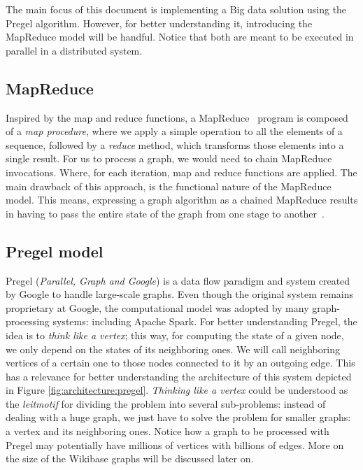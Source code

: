 The main focus of this document is implementing a Big data solution using the Pregel algorithm. However, for better understanding it, introducing the MapReduce model will be handful. Notice that both are meant to be executed in parallel in a distributed system.

\subsection{MapReduce}

Inspired by the map and reduce functions, a MapReduce~\cite{wiki:MapReduce} program is composed of a \textit{map procedure}, where we apply a simple operation to all the elements of a sequence, followed by a \textit{reduce} method, which transforms those elements into a single result. For us to process a graph, we would need to chain MapReduce invocations. Where, for each iteration, map and reduce functions are applied. The main drawback of this approach, is the functional nature of the MapReduce model. This means, expressing a graph algorithm as a chained MapReduce results in having to pass the entire state of the graph from one stage to another~\cite{10.1145/1807167.1807184}.

\subsection{Pregel model}
\label{section:pregel}

Pregel (\textit{Parallel, Graph and Google}) is a data flow paradigm and system created by Google to handle large-scale graphs. Even though the original system remains proprietary at Google, the computational model was adopted by many graph-processing systems: including Apache Spark. For better understanding Pregel, the idea is to \textit{think like a vertex}; this way, for computing the state of a given node, we only depend on the states of its neighboring ones. We will call neighboring vertices of a certain one to those nodes connected to it by an outgoing edge. This has a relevance for better understanding the architecture of this system depicted in Figure \ref{fig:architecture:pregel}. \textit{Thinking like a vertex} could be understood as the \textit{leitmotif} for dividing the problem into several sub-problems: instead of dealing with a huge graph, we just have to solve the problem for smaller graphs: a vertex and its neighboring ones. Notice how a graph to be processed with Pregel may potentially have millions of vertices with billions of edges. More on the size of the Wikibase graphs will be discussed later on.

